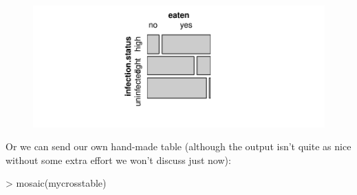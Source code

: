 \begin{figure}[h]
\begin{center}
\includegraphics[width=.65\textwidth]{images/fig-mosaic1}
\end{center}
\end{figure}

\vspace{-12mm}
Or we can send our own hand-made table (although the output isn't quite as nice without some
extra effort we won't discuss just now):
\begin{center}
\begin{Schunk}
\begin{Sinput}
> mosaic(mycrosstable)
\end{Sinput}
\end{Schunk}
\end{center}


